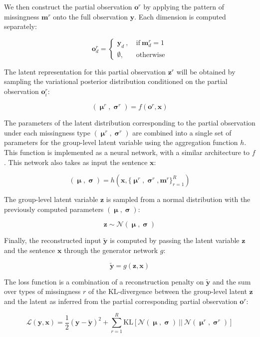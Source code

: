 \documentclass[a4paper,12pt,twoside,openright]{article}
\begin{document}
We then construct the partial observation $\mathbf{o}^r$ by applying the pattern of missingness $\mathbf{m}^r$ onto the full observation $\mathbf{y}$. Each dimension is computed separately:

\[
    \mathbf{o}^r_{d} = \left\{\begin{array}{ll} \mathbf{y}_{d} ~ , ~ &\text{if} ~ \mathbf{m}^r_{d} = 1 \\ \emptyset, &\text{otherwise} \end{array}\right.
\]

The latent representation for this partial observation $\mathbf{z}^r$ will be obtained by sampling the variational posterior distribution conditioned on the partial observation $\mathbf{o}^r_i$:

\[
    (\boldsymbol{\upmu}^r, \boldsymbol{\upsigma}^r) = f(\mathbf{o}^r, \mathbf{x})
\]

The parameters of the latent distribution corresponding to the partial observation under each missingness type $(\boldsymbol{\upmu}^r, \boldsymbol{\upsigma}^r)$ are combined into a single set of parameters for the group-level latent variable using the aggregation function $h$. This function is implemented as a neural network, with a similar architecture to $f$. This network also takes as input the sentence $\mathbf{x}$:

\[
    (\boldsymbol{\upmu}, \boldsymbol{\upsigma}) = h(\mathbf{x}, \{\boldsymbol{\upmu}^r, \boldsymbol{\upsigma}^r, \mathbf{m}^r\}_{r=1}^{R})
\]

The group-level latent variable $\mathbf{z}$ is sampled from a normal distribution with the previously computed parameters $(\boldsymbol{\upmu}, \boldsymbol{\upsigma})$:

\[
    \mathbf{z} \sim \mathcal{N}(\boldsymbol{\upmu}, \boldsymbol{\upsigma})
\]

Finally, the reconstructed input $\tilde{\mathbf{y}}$ is computed by passing the latent variable $\mathbf{z}$ and the sentence $\mathbf{x}$ through the generator network $g$:

\[
    \tilde{\mathbf{y}} = g(\mathbf{z}, \mathbf{x})
\]

The loss function is a combination of a reconstruction penalty on $\tilde{\mathbf{y}}$ and the sum over types of missingness $r$ of the $\mathrm{KL}$-divergence between the group-level latent $\mathbf{z}$ and the latent as inferred from the partial corresponding partial observation $\mathbf{o}^r$: 

\[
    \mathcal{L}(\mathbf{y}, \mathbf{x}) = \frac{1}{2} (\mathbf{y} - \tilde{\mathbf{y}})^2 + \sum_{r=1}^R \mathrm{KL} [\mathcal{N}(\boldsymbol{\upmu}, \boldsymbol{\upsigma}) ~||~ \mathcal{N}(\boldsymbol{\upmu}^r, \boldsymbol{\upsigma}^r)]
\]
\end{document}

